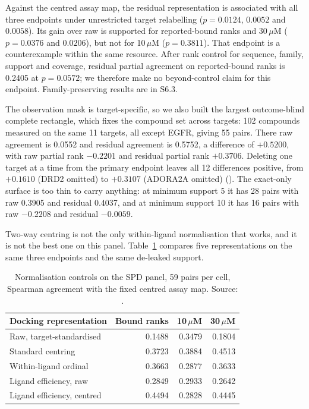 Against the centred assay map, the residual representation is associated with all three endpoints
under unrestricted target relabelling ($p=0.0124$, $0.0052$ and $0.0058$). Its gain over raw is
supported for reported-bound ranks and 30\,$\mu$M ($p=0.0376$ and $0.0206$), but not for
10\,$\mu$M ($p=0.3811$). That endpoint is a counterexample within the same resource. After rank
control for sequence, family, support and coverage, residual partial agreement on reported-bound
ranks is 0.2405 at $p=0.0572$; we therefore make no beyond-control claim for this endpoint.
Family-preserving results are in S6.3.

The observation mask is target-specific, so we also built the largest outcome-blind complete
rectangle, which fixes the compound set across targets: 102 compounds measured on the same 11
targets, all except EGFR, giving 55 pairs. There raw agreement is 0.0552 and residual agreement
is 0.5752, a difference of $+0.5200$, with raw partial rank $-0.2201$ and residual partial rank
$+0.3706$. Deleting one target at a time from the primary endpoint leaves all 12 differences
positive, from $+0.1610$ (DRD2 omitted) to $+0.3107$ (ADORA2A omitted)
(). The exact-only surface is too thin
to carry anything: at minimum support 5 it has 28 pairs with raw 0.3905 and residual 0.4037,
and at minimum support 10 it has 16 pairs with raw $-0.2208$ and residual $-0.0059$.

Two-way centring is not the only within-ligand normalisation that works, and it is not the best
one on this panel. Table~\ref{tab:s6-norm} compares five representations on the same three
endpoints and the same de-leaked support.

\begin{table}[htbp]
\centering
\small
\setlength{\tabcolsep}{5pt}
\caption[Normalisation controls on the SPD panel]{Normalisation controls on the SPD panel, 59 pairs per cell, Spearman agreement with the
fixed centred assay map. Source: .}
\label{tab:s6-norm}
\begin{tabular}{lrrr}
\toprule
Docking representation & Bound ranks & 10\,$\mu$M & 30\,$\mu$M \\
\midrule
Raw, target-standardised          & 0.1488 & 0.3479 & 0.1804 \\
Standard centring                 & 0.3723 & 0.3884 & 0.4513 \\
Within-ligand ordinal             & 0.3663 & 0.2877 & 0.3633 \\
Ligand efficiency, raw            & 0.2849 & 0.2933 & 0.2642 \\
Ligand efficiency, centred        & 0.4494 & 0.2828 & 0.4445 \\
\bottomrule
\end{tabular}
\end{table}

